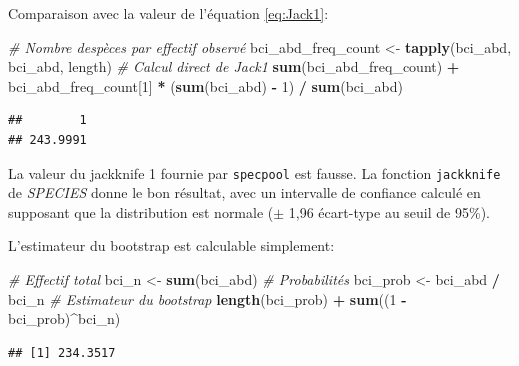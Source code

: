 \documentclass[
  11pt,
  american,
  a4paper,
  extrafontsizes,onecolumn,openright
  ]{memoir}
\newenvironment{Shaded}{\begin{snugshade}}{\end{snugshade}}
\newcommand{\CommentTok}[1]{\textcolor[rgb]{0.56,0.35,0.01}{\textit{#1}}}
\newcommand{\DecValTok}[1]{\textcolor[rgb]{0.00,0.00,0.81}{#1}}
\newcommand{\FunctionTok}[1]{\textcolor[rgb]{0.13,0.29,0.53}{\textbf{#1}}}
\newcommand{\NormalTok}[1]{#1}
\newcommand{\OtherTok}[1]{\textcolor[rgb]{0.56,0.35,0.01}{#1}}
\newcommand{\SpecialCharTok}[1]{\textcolor[rgb]{0.81,0.36,0.00}{\textbf{#1}}}
\begin{document}
\normalsize

Comparaison avec la valeur de l'équation \eqref{eq:Jack1}:

\scriptsize

\begin{Shaded}
\begin{Highlighting}[]
\CommentTok{\# Nombre d\textquotesingle{}espèces par effectif observé}
\NormalTok{bci\_abd\_freq\_count }\OtherTok{\textless{}{-}} \FunctionTok{tapply}\NormalTok{(bci\_abd, bci\_abd, length)}
\CommentTok{\# Calcul direct de Jack1}
\FunctionTok{sum}\NormalTok{(bci\_abd\_freq\_count) }\SpecialCharTok{+} 
\NormalTok{  bci\_abd\_freq\_count[}\DecValTok{1}\NormalTok{] }\SpecialCharTok{*}\NormalTok{ (}\FunctionTok{sum}\NormalTok{(bci\_abd) }\SpecialCharTok{{-}} \DecValTok{1}\NormalTok{) }\SpecialCharTok{/} \FunctionTok{sum}\NormalTok{(bci\_abd)}
\end{Highlighting}
\end{Shaded}

\begin{verbatim}
##        1 
## 243.9991
\end{verbatim}

\normalsize

La valeur du jackknife 1 fournie par \texttt{specpool} est fausse.
La fonction \texttt{jackknife} de \emph{SPECIES} donne le bon résultat, avec un intervalle de confiance calculé en supposant que la distribution est normale (\(\pm\) 1,96 écart-type au seuil de 95\%).

L'estimateur du bootstrap est calculable simplement:

\scriptsize

\begin{Shaded}
\begin{Highlighting}[]
\CommentTok{\# Effectif total}
\NormalTok{bci\_n }\OtherTok{\textless{}{-}} \FunctionTok{sum}\NormalTok{(bci\_abd)}
\CommentTok{\# Probabilités}
\NormalTok{bci\_prob }\OtherTok{\textless{}{-}}\NormalTok{ bci\_abd }\SpecialCharTok{/}\NormalTok{ bci\_n}
\CommentTok{\# Estimateur du bootstrap}
\FunctionTok{length}\NormalTok{(bci\_prob) }\SpecialCharTok{+} \FunctionTok{sum}\NormalTok{((}\DecValTok{1} \SpecialCharTok{{-}}\NormalTok{ bci\_prob)}\SpecialCharTok{\^{}}\NormalTok{bci\_n)}
\end{Highlighting}
\end{Shaded}

\begin{verbatim}
## [1] 234.3517
\end{verbatim}
\end{document}
